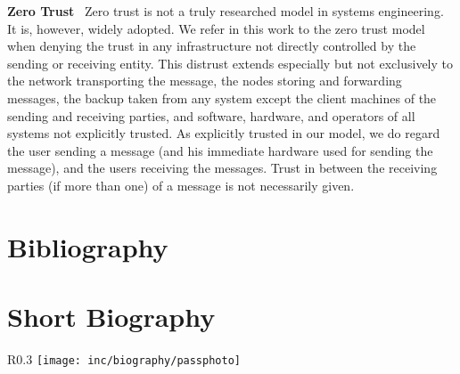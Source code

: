 \documentclass[a4paper,appendixprefix,pdfusetitle,twocolumn,fontsize=8pt,DIV=calc,8pt,draft]{\doctype} %
\newenvironment{entry}{\par\leavevmode\hangpara{1.5mm}{1}\ignorespaces}{\RaggedRight\par}
\newcommand*{\mainentry}[2]{{\bfseries{#1\label{def:#1}}}~#2\par}
\begin{document}
\begin{entry}
	\mainentry{Zero Trust}{
		Zero trust is not a truly researched model in systems engineering. It is, however, widely adopted. We refer in this work to the zero trust model when denying the trust in any infrastructure not directly controlled by the sending or receiving entity. This distrust extends especially but not exclusively to the network transporting the message, the nodes storing and forwarding messages, the backup taken from any system except the client machines of the sending and receiving parties, and software, hardware, and operators of all systems not explicitly trusted. As explicitly trusted in our model, we do regard the user sending a message (and his immediate hardware used for sending the message), and the users receiving the messages. Trust in between the receiving parties (if more than one) of a message is not necessarily given.
	}
\end{entry}        

\backmatter
\chapter{Bibliography}
{
  \printbibliography[title={},heading=none]
}



\clearpage\chapter{Short Biography}
\begin{wrapfigure}{R}{0.3\columnwidth}
	\texttt{[image: inc/biography/passphoto]}
\end{wrapfigure}

\end{document}
